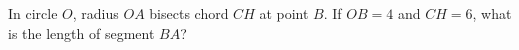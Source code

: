 In circle $O$, radius $OA$ bisects chord $CH$ at point $B$. If $OB=4$ and $CH=6$, what is the length of segment $BA$?
